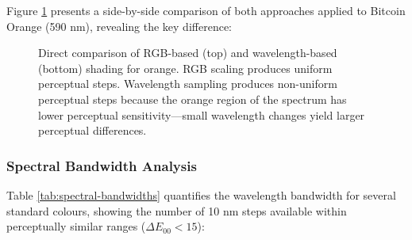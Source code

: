 \documentclass[12pt,a4paper]{article}
\newcommand{\deltaE}{\Delta E_{00}}
\begin{document}
Figure \ref{fig:rgb-vs-wavelength-shading} presents a side-by-side comparison of both approaches applied to Bitcoin Orange (590 nm), revealing the key difference:

\begin{figure}[H]
\centering
{}
\caption{Direct comparison of RGB-based (top) and wavelength-based (bottom) shading for orange. RGB scaling produces uniform perceptual steps. Wavelength sampling produces non-uniform perceptual steps because the orange region of the spectrum has lower perceptual sensitivity—small wavelength changes yield larger perceptual differences.}
\label{fig:rgb-vs-wavelength-shading}
\end{figure}

\subsubsection{Spectral Bandwidth Analysis}

Table \ref{tab:spectral-bandwidths} quantifies the wavelength bandwidth for several standard colours, showing the number of 10 nm steps available within perceptually similar ranges ($\deltaE < 15$):
\end{document}
